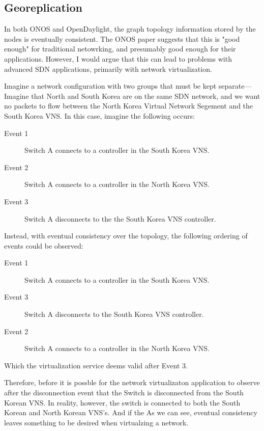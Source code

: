 \documentclass[letterpaper,twocolumn,10pt]{article}
\begin{document}
\subsection{Georeplication}

In both ONOS and OpenDaylight, the graph topology information stored by the nodes is eventually consistent. The ONOS paper suggests that this is "good enough" for traditional netowrking, and presumably good enough for their applications. However, I would argue that this can lead to problems with advanced SDN applications, primarily with network virtualization.

Imagine a network configuration with two groups that must be kept separate---Imagine that North and South Korea are on the same SDN network, and we want no packets to flow between the North Korea Virtual Network Segement and the South Korea VNS. In this case, imagine the following occurs:

\begin{description}
\item [Event 1] Switch A connects to a controller in the South Korea VNS.
\item [Event 2] Switch A connects to a controller in the North Korea VNS.
\item [Event 3] Switch A disconnects to the the South Korea VNS controller.
\end{description}

Instead, with eventual consistency over the topology, the following ordering of events could be observed:

\begin{description}
\item [Event 1] Switch A connects to a controller in the South Korea VNS.
\item [Event 3] Switch A disconnects to the South Korea VNS controller.
\item [Event 2] Switch A connects to a controller in the North Korea VNS.
\end{description}

Which the virtualization service deems valid after Event 3.

Therefore, before it is possble for the network virtualizaton application to observe after the disconnection event that the Switch is disconnected from the South Korean VNS. In reality, however, the switch is connected to both the South Korean and North Korean VNS's. And if the 
As we can see, eventual consistency leaves something to be desired when virtualzing a network.
\end{document}
